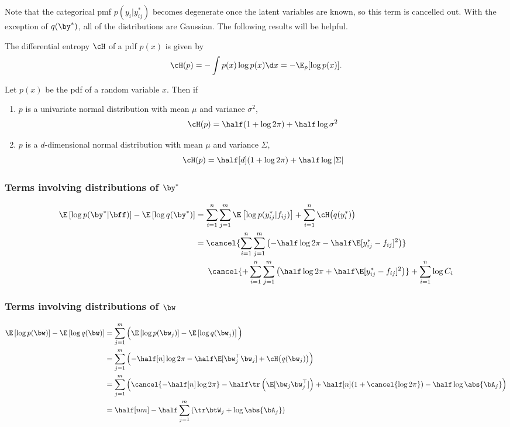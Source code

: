 \documentclass[]{article}
\begin{document}
Note that the categorical pmf $p(y_i|y_{ij}^*)$ becomes degenerate once the latent variables are known, so this term is cancelled out. With the exception of $q(\by^*)$, all of the distributions are Gaussian. The following results will be helpful. 

\begin{defn}
  The differential entropy $\cH$ of a pdf $p(x)$ is given by
  \[
    \cH(p) = -\int p(x) \log p(x) \d x = -\E_p[\log p(x)].
  \]
\end{defn}

\begin{lem}\label{thm:normentropy}
  Let $p(x)$ be the pdf of a random variable $x$. Then if
  \begin{enumerate}[label=(\roman*)]
    \item $p$ is a univariate normal distribution with mean $\mu$ and variance $\sigma^2$,
    \[
      \cH(p) = \half (1 + \log 2\pi) + \half \log \sigma^2
    \]
    \item $p$ is a $d$-dimensional normal distribution with mean $\mu$ and variance $\Sigma$,
    \[
      \cH(p) = \half[d] (1 + \log 2\pi) + \half \log \vert \Sigma \vert 
    \]
  \end{enumerate}
\end{lem}

\subsubsection{Terms involving distributions of $\by^*$}

\begin{align*}
  \E\left[ \log p(\by^* | \bff) \right] - \E\left[ \log q(\by^*) \right]
  &= \sum_{i=1}^n \sum_{j=1}^m \E \left[ \log p(y_{ij}^* | f_{ij}) \right] + \sum_{i=1}^n \cH\big(q(y_i^*)\big) \\
  &= \cancel{\sum_{i=1}^n \sum_{j=1}^m \left( -\half\log 2\pi -\half \E[y_{ij}^* - f_{ij}]^2 \right)} \\
  &\phantom{==} \cancel{+ \sum_{i=1}^n \sum_{j=1}^m \left( \half\log 2\pi + \half \E[y_{ij}^* - f_{ij}]^2 \right)} + \sum_{i=1}^n \log C_i \\
\end{align*}

\subsubsection{Terms involving distributions of $\bw$}

\begin{align*}
  \E\left[ \log p(\bw) \right] - \E\left[ \log q(\bw) \right]
  &= \sum_{j=1}^m \Big( \E\left[ \log p(\bw_j) \right] - \E\left[ \log q(\bw_j) \right] \Big)  \\
  &= \sum_{j=1}^m \left( -\half[n] \log 2\pi - \half \E[\bw_j^\top\bw_j] + \cH\big(q(\bw_j)\big) \right) \\
  &= \sum_{j=1}^m \left( \cancel{-\half[n] \log 2\pi} - \half\tr\left( \E[\bw_j\bw_j^\top]\right) + \half[n] (1 + \cancel{\log 2\pi}) - \half \log \abs{\bA_j} \right) \\
  &= \half[nm] - \half \sum_{j=1}^m \left( \tr \btW_j + \log \abs{\bA_j} \right)
\end{align*}
\end{document}
